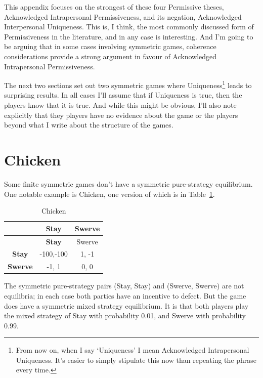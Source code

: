 \documentclass[
  12pt,
  letterpaper,
  DIV=11,
  numbers=noendperiod]{scrreprt}
\begin{document}
This appendix focuses on the strongest of these four Permissive theses,
Acknowledged Intrapersonal Permissiveness, and its negation,
Acknowledged Interpersonal Uniqueness. This is, I think, the most
commonly discussed form of Permissiveness in the literature, and in any
case is interesting. And I'm going to be arguing that in some cases
involving symmetric games, coherence considerations provide a strong
argument in favour of Acknowledged Intrapersonal Permissiveness.

The next two sections set out two symmetric games where
Uniqueness\footnote{From now on, when I say `Uniqueness' I mean
  Acknowledged Intrapersonal Uniqueness. It's easier to simply stipulate
  this now than repeating the phrase every time.} leads to surprising
results. In all cases I'll assume that if Uniqueness is true, then the
players know that it is true. And while this might be obvious, I'll also
note explicitly that they players have no evidence about the game or the
players beyond what I write about the structure of the games.

\hypertarget{chicken}{%
\section{Chicken}\label{chicken}}

Some finite symmetric games don't have a symmetric pure-strategy
equilibrium. One notable example is Chicken, one version of which is in
Table~\ref{tbl-unique-chicken}.

\hypertarget{tbl-unique-chicken}{}
\begin{longtable}[]{@{}ccc@{}}
\caption{\label{tbl-unique-chicken}Chicken}\tabularnewline
\toprule\noalign{}
& \textbf{Stay} & Swerve \\
\midrule\noalign{}
\endfirsthead
\toprule\noalign{}
& \textbf{Stay} & Swerve \\
\midrule\noalign{}
\endhead
\bottomrule\noalign{}
\endlastfoot
\textbf{Stay} & -100,-100 & 1, -1 \\
\textbf{Swerve} & -1, 1 & 0, 0 \\
\end{longtable}

The symmetric pure-strategy pairs (Stay, Stay) and (Swerve, Swerve) are
not equilibria; in each case both parties have an incentive to defect.
But the game does have a symmetric mixed strategy equilibrium. It is
that both players play the mixed strategy of Stay with probability 0.01,
and Swerve with probability 0.99.
\end{document}
